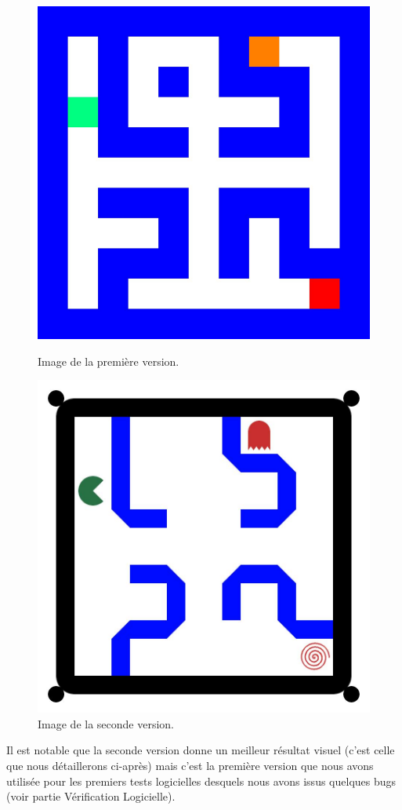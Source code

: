 \begin{figure}[!ht]
\begin{minipage}{.48\textwidth}
\centering
\vfill%
\includegraphics[width = .5\textwidth]{./4_Verifications/Simu.jpg}
\caption{\label{fig:4_simu}Image de la première version.}\vfill%
\end{minipage}\hfill%
\begin{minipage}{.48\textwidth}
\centering
\vfill%
\includegraphics[width = .5\textwidth]{./4_Verifications/Simu_textured.jpg}
\caption{\label{fig:4_simutext}Image de la seconde version.}\vfill%
\end{minipage}
\end{figure}
Il est notable que la seconde version donne un meilleur résultat visuel (c'est celle que nous détaillerons ci-après) mais c'est la première version que nous avons utilisée pour les premiers tests logicielles desquels nous avons issus quelques bugs (voir partie Vérification Logicielle).

